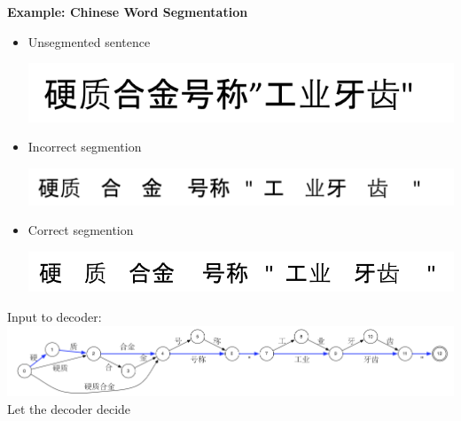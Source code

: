\documentclass[landscape]{uedslides2C}
\begin{document}
\begin{center}
\bf Example: Chinese Word Segmentation
\end{center}

\vspace{5mm}
\begin{itemize}
\item  Unsegmented sentence
\vspace{-5mm}
\begin{center}
\includegraphics[scale=1]{chinese-unsegmented.png}
\end{center}

\item  Incorrect segmention
\vspace{-5mm}
\begin{center}
\includegraphics[scale=1]{chinese-segmented-incorrect.png}
\end{center}

\item  Correct segmention
\vspace{-5mm}
\begin{center}
\includegraphics[scale=1]{chinese-segmented-correct.png}
\end{center}

\end{itemize}



\vspace{20mm}
\begin{center}
Input to decoder:\\[10mm]
\includegraphics[scale=1.4]{lattice-chinese.png}\\[10mm]
Let the decoder decide
\end{center}
\end{document}
